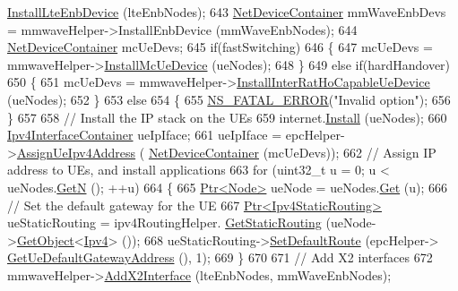 \begin{DoxyCode}
{      \hyperlink{classns3_1_1MmWaveHelper_a5c265e74ff3134d117adabadb1e25357}{InstallLteEnbDevice} (lteEnbNodes);
643   \hyperlink{classns3_1_1NetDeviceContainer}{NetDeviceContainer} mmWaveEnbDevs = mmwaveHelper->InstallEnbDevice (mmWaveEnbNodes);
644   \hyperlink{classns3_1_1NetDeviceContainer}{NetDeviceContainer} mcUeDevs;
645   \textcolor{keywordflow}{if}(fastSwitching)
646   \{
647     mcUeDevs = mmwaveHelper->\hyperlink{classns3_1_1MmWaveHelper_a0d017af816f9651994b5ae38e55f4584}{InstallMcUeDevice} (ueNodes);
648   \} 
649   \textcolor{keywordflow}{else} \textcolor{keywordflow}{if}(hardHandover)
650   \{
651     mcUeDevs = mmwaveHelper->\hyperlink{classns3_1_1MmWaveHelper_a4a30b6e9361765ac818cebbf337b8231}{InstallInterRatHoCapableUeDevice} (ueNodes);
652   \}
653   \textcolor{keywordflow}{else}
654   \{
655     \hyperlink{group__fatal_ga5131d5e3f75d7d4cbfd706ac456fdc85}{NS\_FATAL\_ERROR}(\textcolor{stringliteral}{"Invalid option"});
656   \}
657 
658   \textcolor{comment}{// Install the IP stack on the UEs}
659   internet.\hyperlink{classns3_1_1InternetStackHelper_a6645b412f31283d2d9bc3d8a95cebbc0}{Install} (ueNodes);
660   \hyperlink{classns3_1_1Ipv4InterfaceContainer}{Ipv4InterfaceContainer} ueIpIface;
661   ueIpIface = epcHelper->\hyperlink{classns3_1_1MmWavePointToPointEpcHelper_ad96757d4c63d33f683dce1b5d6bca3b9}{AssignUeIpv4Address} (
      \hyperlink{classns3_1_1NetDeviceContainer}{NetDeviceContainer} (mcUeDevs));
662   \textcolor{comment}{// Assign IP address to UEs, and install applications}
663   \textcolor{keywordflow}{for} (uint32\_t u = 0; u < ueNodes.\hyperlink{classns3_1_1NodeContainer_aed647ac56d0407a7706aba02eb44b951}{GetN} (); ++u)
664   \{
665     \hyperlink{classns3_1_1Ptr}{Ptr<Node>} ueNode = ueNodes.\hyperlink{classns3_1_1NodeContainer_a9ed96e2ecc22e0f5a3d4842eb9bf90bf}{Get} (u);
666     \textcolor{comment}{// Set the default gateway for the UE}
667     \hyperlink{classns3_1_1Ptr}{Ptr<Ipv4StaticRouting>} ueStaticRouting = ipv4RoutingHelper.
      \hyperlink{classns3_1_1Ipv4StaticRoutingHelper_a731206e50d305695dac7fb2ef963a4bb}{GetStaticRouting} (ueNode->\hyperlink{classns3_1_1Object_a13e18c00017096c8381eb651d5bd0783}{GetObject}<\hyperlink{classns3_1_1Ipv4}{Ipv4}> ());
668     ueStaticRouting->\hyperlink{classns3_1_1Ipv4StaticRouting_aee30fa3246c2b42f122dabdff2725331}{SetDefaultRoute} (epcHelper->
      \hyperlink{classns3_1_1MmWavePointToPointEpcHelper_afefac14ad79ff059b052305013d2beb3}{GetUeDefaultGatewayAddress} (), 1);
669   \}
670 
671   \textcolor{comment}{// Add X2 interfaces}
672   mmwaveHelper->\hyperlink{classns3_1_1MmWaveHelper_a879c5e60c46b04b9decd31624b91cc70}{AddX2Interface} (lteEnbNodes, mmWaveEnbNodes);
}
\end{DoxyCode}
